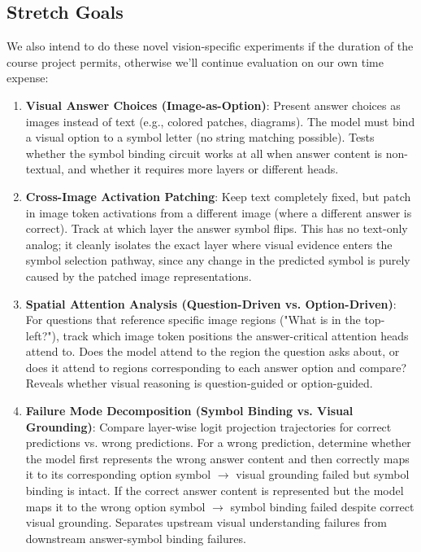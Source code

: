\documentclass[11pt]{article}
\begin{document}
\subsection{Stretch Goals}

We also intend to do these novel vision-specific experiments if the duration of the course project permits, otherwise we'll continue evaluation on our own time expense:

\begin{enumerate}

\item \textbf{Visual Answer Choices (Image-as-Option)}: Present answer choices as images instead of text (e.g., colored patches, diagrams). The model must bind a visual option to a symbol letter (no string matching possible). Tests whether the symbol binding circuit works at all when answer content is non-textual, and whether it requires more layers or different heads.

\item \textbf{Cross-Image Activation Patching}: Keep text completely fixed, but patch in image token activations from a different image (where a different answer is correct). Track at which layer the answer symbol flips. This has no text-only analog; it cleanly isolates the exact layer where visual evidence enters the symbol selection pathway, since any change in the predicted symbol is purely caused by the patched image representations.

\item \textbf{Spatial Attention Analysis (Question-Driven vs. Option-Driven)}: For questions that reference specific image regions ("What is in the top-left?"), track which image token positions the answer-critical attention heads attend to. Does the model attend to the region the question asks about, or does it attend to regions corresponding to each answer option and compare? Reveals whether visual reasoning is question-guided or option-guided.

\item \textbf{Failure Mode Decomposition (Symbol Binding vs. Visual Grounding)}: Compare layer-wise logit projection trajectories for correct predictions vs. wrong predictions. For a wrong prediction, determine whether the model first represents the wrong answer content and then correctly maps it to its corresponding option symbol $\rightarrow$ visual grounding failed but symbol binding is intact. If the correct answer content is represented but the model maps it to the wrong option symbol $\rightarrow$ symbol binding failed despite correct visual grounding. Separates upstream visual understanding failures from downstream answer-symbol binding failures.

\end{enumerate}
\end{document}
